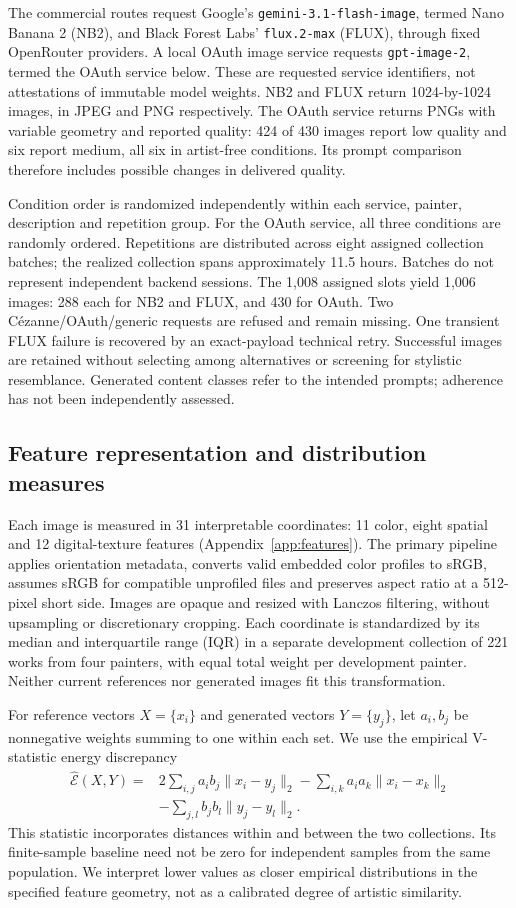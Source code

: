\documentclass[11pt]{article}
\newcommand{\E}{\widehat{\mathcal E}}
\begin{document}
The commercial routes request Google's \texttt{gemini-3.1-flash-image}, termed
Nano Banana 2 (NB2), and Black Forest Labs' \texttt{flux.2-max} (FLUX), through
fixed OpenRouter providers. A local OAuth image service requests
\texttt{gpt-image-2}, termed the OAuth service below. These are requested service
identifiers, not attestations of immutable model weights. NB2 and FLUX return
1024-by-1024 images, in JPEG and PNG respectively. The OAuth service returns
PNGs with variable geometry and reported quality: 424 of 430 images report low
quality and six report medium, all six in artist-free conditions. Its prompt
comparison therefore includes possible changes in delivered quality.

Condition order is randomized independently within each service, painter,
description and repetition group. For the OAuth service, all three conditions
are randomly ordered. Repetitions are distributed across eight assigned
collection batches; the realized collection spans approximately 11.5 hours.
Batches do not represent independent backend sessions. The 1,008 assigned
slots yield 1,006 images: 288 each for NB2 and FLUX, and 430 for OAuth. Two
C\'ezanne/OAuth/generic requests are refused and remain missing. One transient
FLUX failure is recovered by an exact-payload technical retry. Successful images
are retained without selecting among alternatives or screening for stylistic
resemblance. Generated content classes refer to the intended prompts; adherence
has not been independently assessed.

\subsection{Feature representation and distribution measures}
Each image is measured in 31 interpretable coordinates: 11 color, eight spatial
and 12 digital-texture features (Appendix~\ref{app:features}). The primary
pipeline applies orientation metadata, converts valid embedded color profiles
to sRGB, assumes sRGB for compatible unprofiled files and preserves aspect ratio
at a 512-pixel short side. Images are opaque and resized with Lanczos filtering,
without upsampling or discretionary cropping. Each coordinate is standardized
by its median and interquartile range (IQR) in a separate development collection
of 221 works from four painters, with equal total weight per development painter.
Neither current references nor generated images fit this transformation.

For reference vectors $X=\{x_i\}$ and generated vectors $Y=\{y_j\}$, let
$a_i,b_j$ be nonnegative weights summing to one within each set. We use the
empirical V-statistic energy discrepancy
\begin{align}
\E(X,Y)={}&2\sum_{i,j}a_i b_j\|x_i-y_j\|_2
-\sum_{i,k}a_i a_k\|x_i-x_k\|_2 \nonumber\\
&-\sum_{j,l}b_j b_l\|y_j-y_l\|_2.
\label{eq:energy}
\end{align}
This statistic incorporates distances within and between the two collections.
Its finite-sample baseline need not be zero for independent samples from the
same population. We interpret lower values as closer empirical distributions
in the specified feature geometry, not as a calibrated degree of artistic
similarity.
\end{document}
